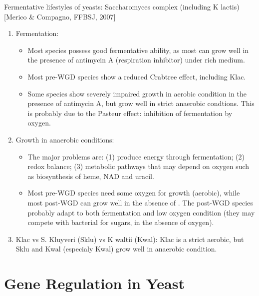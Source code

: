 \documentclass{report}
\begin{document}
Fermentative lifestyles of yeasts: Saccharomyces complex (including K lactis) [Merico \& Compagno, FFBSJ, 2007]
\begin{enumerate}
	\item Fermentation: 
	\begin{itemize}
		\item Most species possess good fermentative ability, as most can grow well in the presence of antimycin A (respiration inhibitor) under rich medium. 
		\item Most pre-WGD species show a reduced Crabtree effect, including Klac. 
		\item Some species show severely impaired growth in aerobic condition in the presence of antimycin A, but grow well in strict anaerobic condtions. This is probably due to the Pasteur effect: inhibition of fermentation by oxygen. 
	\end{itemize}
	
	\item Growth in anaerobic conditions: 
	\begin{itemize}
		\item The major problems are: (1) produce energy through fermentation; (2) redox balance; (3) metabolic pathways that may depend on oxygen such as biosynthesis of heme, NAD and uracil.
		\item Most pre-WGD species need some oxygen for growth (aerobic), while most post-WGD can grow well in the absence of . The post-WGD species probably adapt to both fermentation and low oxygen condition (they may compete with bacterial for sugars, in the absence of oxygen). 
	\end{itemize}
	\item Klac vs S. Kluyveri (Sklu) vs K waltii (Kwal): Klac is a strict aerobic, but Sklu and Kwal (especialy Kwal) grow well in anaerobic condition. 
\end{enumerate}
\section{Gene Regulation in Yeast} 
\end{document}
